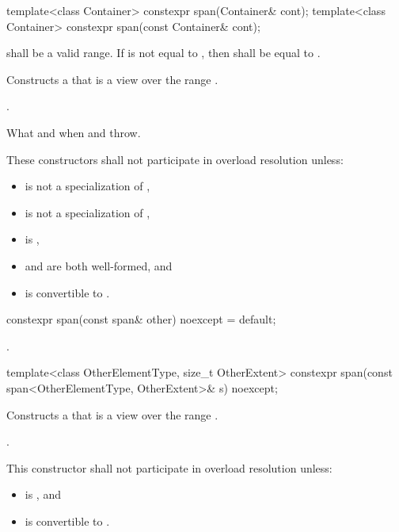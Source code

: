 %
\begin{itemdecl}
template<class Container> constexpr span(Container& cont);
template<class Container> constexpr span(const Container& cont);
\end{itemdecl}
\begin{itemdescr}
\pnum
\requires
{} shall be a valid range.
If  is not equal to ,
then  shall be equal to .

\pnum
\effects
Constructs a  that is a view over the range .

\pnum
\ensures
{}.

\pnum
\throws
What and when  and  throw.

\pnum
\remarks
These constructors shall not participate in overload resolution unless:
\begin{itemize}
\item {} is not a specialization of ,
\item {} is not a specialization of ,
\item {} is ,
\item {} and  are both well-formed, and
\item {} is convertible to .
\end{itemize}
\end{itemdescr}

%
\begin{itemdecl}
constexpr span(const span& other) noexcept = default;
\end{itemdecl}
\begin{itemdescr}
\pnum
\ensures
{}.
\end{itemdescr}

%
\begin{itemdecl}
template<class OtherElementType, size_t OtherExtent>
  constexpr span(const span<OtherElementType, OtherExtent>& s) noexcept;
\end{itemdecl}
\begin{itemdescr}
\pnum
\effects
Constructs a  that is a view over the range
.

\pnum
\ensures
{}.

\pnum
\remarks
This constructor shall not participate in overload resolution unless:
\begin{itemize}
\item {} is , and
\item {} is convertible to .
\end{itemize}
\end{itemdescr}

